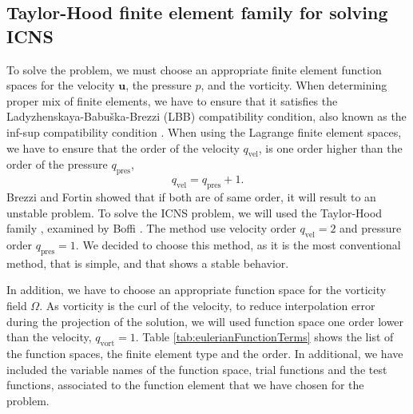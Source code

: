 \subsection{Taylor-Hood finite element family for solving ICNS}
To solve the  problem, we must choose an appropriate finite element function spaces for the velocity $\mathbf{u}$, the pressure $p$, and the vorticity. When determining proper mix of finite elements, we have to ensure that it satisfies the Ladyzhenskaya-Babu\v{s}ka-Brezzi (LBB) compatibility condition, also known as the inf-sup compatibility condition \cite{Brezzi1991}. When using the Lagrange finite element spaces, we have to ensure that the order of the velocity $q_{\mathrm{vel}}$, is one order higher than the order of the pressure $q_{\mathrm{pres}}$,
	\begin{equation}
	q_{\mathrm{vel}} = 	q_{\mathrm{pres}} + 1.
	\end{equation}
Brezzi and Fortin \cite{Brezzi1991} showed that if both are of same order, it will result to an unstable problem. To solve the ICNS problem, we will used the Taylor-Hood family \cite{Taylor1973}, examined by Boffi \cite{Boffi1997}. The method use velocity order $q_{\mathrm{vel}} = 2$ and pressure order $q_{\mathrm{pres}} = 1$. We decided to choose this method, as it is the most conventional method, that is simple, and that shows a stable behavior.

In addition, we have to choose an appropriate function space for the vorticity field $\Omega$. As vorticity is the curl of the velocity, to reduce interpolation error during the projection of the solution, we will used function space one order lower than the velocity, $q_{\mathrm{vort}} = 1$. Table \ref{tab:eulerianFunctionTerms} shows the list of the function spaces, the finite element type and the order. In additional, we have included the variable names of the function space, trial functions and the test functions, associated to the function element that we have chosen for the problem.



